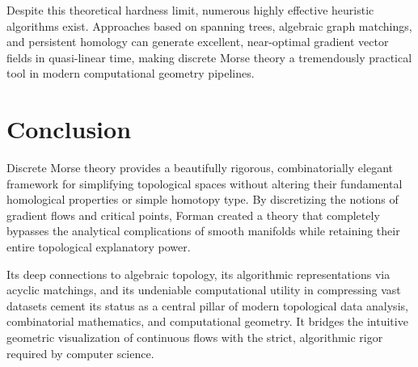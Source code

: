 Despite this theoretical hardness limit, numerous highly effective heuristic algorithms exist. Approaches based on spanning trees, algebraic graph matchings, and persistent homology can generate excellent, near-optimal gradient vector fields in quasi-linear time, making discrete Morse theory a tremendously practical tool in modern computational geometry pipelines.

\section{Conclusion}

Discrete Morse theory provides a beautifully rigorous, combinatorially elegant framework for simplifying topological spaces without altering their fundamental homological properties or simple homotopy type. By discretizing the notions of gradient flows and critical points, Forman created a theory that completely bypasses the analytical complications of smooth manifolds while retaining their entire topological explanatory power. 

Its deep connections to algebraic topology, its algorithmic representations via acyclic matchings, and its undeniable computational utility in compressing vast datasets cement its status as a central pillar of modern topological data analysis, combinatorial mathematics, and computational geometry. It bridges the intuitive geometric visualization of continuous flows with the strict, algorithmic rigor required by computer science.
